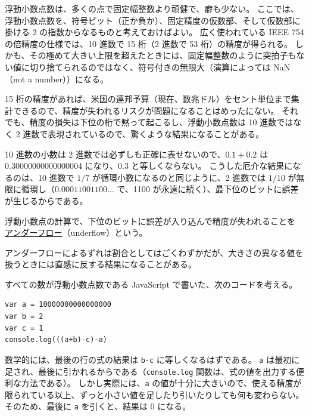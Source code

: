 \documentclass[uplatex]{jsarticle}
\def\label#1{}%
\begin{document}
浮動小数点数は、多くの点で固定幅整数より頑健で、癖も少ない。
ここでは、浮動小数点数を、符号ビット（正か負か）、固定精度の仮数部、そして仮数部に掛ける 2 の指数からなるものと考えておけばよい。
広く使われている IEEE 754 の倍精度の仕様では、10 進数で 15 桁（2 進数で 53 桁）の精度が得られる。
しかも、その極めて大きい上限を超えたときには、固定幅整数のように突拍子もない値に切り捨てられるのではなく、符号付きの無限大（演算によっては NaN（not a number））になる。

15 桁の精度があれば、米国の連邦予算（現在、数兆ドル）をセント単位まで集計できるので、精度が失われるリスクが問題になることはめったにない。
それでも、精度の損失は下位の桁で黙って起こるし、浮動小数点数は 10 進数ではなく 2 進数で表現されているので、驚くような結果になることがある。

\begin{exa}[0.1 + 0.2]\label{exa:ch9-point-one-plus-point-two}
10 進数の小数は 2 進数では必ずしも正確に表せないので、$0.1 + 0.2$ は 0.30000000000000004 になり、0.3 と等しくならない。
こうした厄介な結果になるのは、10 進数で $1/7$ が循環小数になるのと同じように、2 進数では $1/10$ が無限に循環し（$0.00011001100\ldots$ で、1100 が永遠に続く）、最下位のビットに誤差が生じるからである。
\end{exa}

\begin{dfn}[アンダーフロー]\label{dfn:ch9-underflow}
浮動小数点の計算で、下位のビットに誤差が入り込んで精度が失われることを \underline{アンダーフロー}（underflow）という。
\end{dfn}

アンダーフローによるずれは割合としてはごくわずかだが、大きさの異なる値を扱うときには直感に反する結果になることがある。

\begin{exa}[大きさの異なる値の加減算]\label{exa:ch9-javascript-underflow}
すべての数が浮動小数点数である JavaScript で書いた、次のコードを考える。
\begin{verbatim}
var a = 10000000000000000
var b = 2
var c = 1
console.log(((a+b)-c)-a)
\end{verbatim}
数学的には、最後の行の式の結果は \texttt{b-c} に等しくなるはずである。
\texttt{a} は最初に足され、最後に引かれるからである（\texttt{console.log} 関数は、式の値を出力する便利な方法である）。
しかし実際には、\texttt{a} の値が十分に大きいので、使える精度が限られている以上、ずっと小さい値を足したり引いたりしても何も変わらない。
そのため、最後に \texttt{a} を引くと、結果は 0 になる。
\end{exa}
\end{document}
